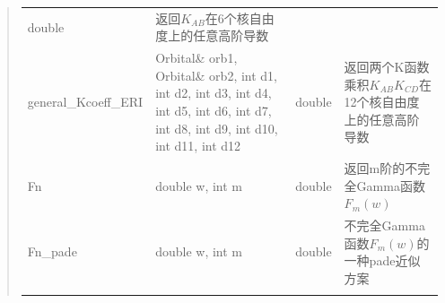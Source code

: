 \documentclass[11pt]{article}
\begin{document}
\begin{quote}
\begin{longtable}[]{@{}llll@{}}
\begin{minipage}[t]{0.07\columnwidth}
double\strut
\end{minipage} & \begin{minipage}[t]{0.27\columnwidth}\raggedright\strut
返回\(K_{AB}\)在6个核自由度上的任意高阶导数\strut
\end{minipage}\tabularnewline
\begin{minipage}[t]{0.17\columnwidth}\raggedright\strut
general\_Kcoeff\_ERI\strut
\end{minipage} & \begin{minipage}[t]{0.37\columnwidth}\raggedright\strut
Orbital\& orb1, Orbital\& orb2, int d1, int d2, int d3, int d4, int d5,
int d6, int d7, int d8, int d9, int d10, int d11, int d12\strut
\end{minipage} & \begin{minipage}[t]{0.07\columnwidth}\raggedright\strut
double\strut
\end{minipage} & \begin{minipage}[t]{0.27\columnwidth}\raggedright\strut
返回两个K函数乘积\(K_{AB}K_{CD}\)在12个核自由度上的任意高阶导数\strut
\end{minipage}\tabularnewline
\begin{minipage}[t]{0.17\columnwidth}\raggedright\strut
Fn\strut
\end{minipage} & \begin{minipage}[t]{0.37\columnwidth}\raggedright\strut
double w, int m\strut
\end{minipage} & \begin{minipage}[t]{0.07\columnwidth}\raggedright\strut
double\strut
\end{minipage} & \begin{minipage}[t]{0.27\columnwidth}\raggedright\strut
返回m阶的不完全Gamma函数\(F_m(w)\)\strut
\end{minipage}\tabularnewline
\begin{minipage}[t]{0.17\columnwidth}\raggedright\strut
Fn\_pade\strut
\end{minipage} & \begin{minipage}[t]{0.37\columnwidth}\raggedright\strut
double w, int m\strut
\end{minipage} & \begin{minipage}[t]{0.07\columnwidth}\raggedright\strut
double\strut
\end{minipage} & \begin{minipage}[t]{0.27\columnwidth}\raggedright\strut
不完全Gamma函数\(F_m(w)\)的一种pade近似方案\strut
\end{minipage}\tabularnewline
\begin{minipage}[t]{0.17\columnwidth}\raggedright\strut

\end{minipage}
\end{longtable}
\end{quote}
\end{document}
